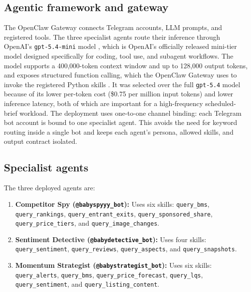 \subsection{Agentic framework and gateway}

The OpenClaw Gateway connects Telegram accounts, LLM prompts, and
registered tools. The three specialist agents route their inference
through OpenAI's \texttt{gpt-5.4-mini} model
\citep{openai2026gpt54mini}, which is OpenAI's officially released
mini-tier model designed specifically for coding, tool use, and
subagent workflows. The model supports a 400,000-token context window
and up to 128,000 output tokens, and exposes structured function
calling, which the OpenClaw Gateway uses to invoke the registered
Python skills \citep{openai2026gpt54mini}. It was selected over the
full \texttt{gpt-5.4} model because of its lower per-token cost
(\$0.75 per million input tokens) and lower inference latency, both
of which are important for a high-frequency scheduled-brief workload.
The deployment uses one-to-one channel binding: each
Telegram bot account is bound to one specialist agent. This avoids the
need for keyword routing inside a single bot and keeps each agent's
persona, allowed skills, and output contract isolated.

\subsection{Specialist agents}

The three deployed agents are:
\begin{enumerate}
    \item \textbf{Competitor Spy (\texttt{@babyspyyy\_bot}):} Uses six
    skills: \texttt{query\_bms}, \texttt{query\_rankings},
    \texttt{query\_entrant\_exits}, \texttt{query\_sponsored\_share},
    \texttt{query\_price\_tiers}, and \texttt{query\_image\_changes}.

    \item \textbf{Sentiment Detective (\texttt{@babydetective\_bot}):}
    Uses four skills: \texttt{query\_sentiment}, \texttt{query\_reviews},
    \texttt{query\_aspects}, and \texttt{query\_snapshots}.

    \item \textbf{Momentum Strategist (\texttt{@babystrategist\_bot}):}
    Uses six skills: \texttt{query\_alerts}, \texttt{query\_bms},
    \texttt{query\_price\_forecast}, \texttt{query\_lqs},
    \texttt{query\_sentiment}, and \texttt{query\_listing\_content}.
\end{enumerate}

